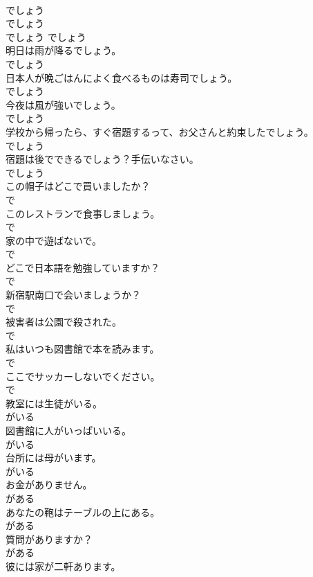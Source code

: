 \documentclass[8pt]{extreport}
\begin{document}
\begin{CJK}{UTF8}{min}
\\	でしょう	
\\	でしょう	
\\	でしょう	でしょう	
\\	明日は雨が降るでしょう。	
\\	でしょう	
\\	日本人が晩ごはんによく食べるものは寿司でしょう。	
\\	でしょう	
\\	今夜は風が強いでしょう。	
\\	でしょう	
\\	学校から帰ったら、すぐ宿題するって、お父さんと約束したでしょう。	
\\	でしょう	
\\	宿題は後でできるでしょう？手伝いなさい。	
\\	でしょう	
\\	この帽子はどこで買いましたか？	
\\	で	
\\	このレストランで食事しましょう。	
\\	で	
\\	家の中で遊ばないで。	
\\	で	
\\	どこで日本語を勉強していますか？	
\\	で	
\\	新宿駅南口で会いましょうか？	
\\	で	
\\	被害者は公園で殺された。	
\\	で	
\\	私はいつも図書館で本を読みます。	
\\	で	
\\	ここでサッカーしないでください。	
\\	で	
\\	教室には生徒がいる。	
\\	がいる	
\\	図書館に人がいっぱいいる。	
\\	がいる	
\\	台所には母がいます。	
\\	がいる	
\\	お金がありません。	
\\	がある	
\\	あなたの鞄はテーブルの上にある。	
\\	がある	
\\	質問がありますか？	
\\	がある	
\\	彼には家が二軒あります。	

\end{CJK}
\end{document}
